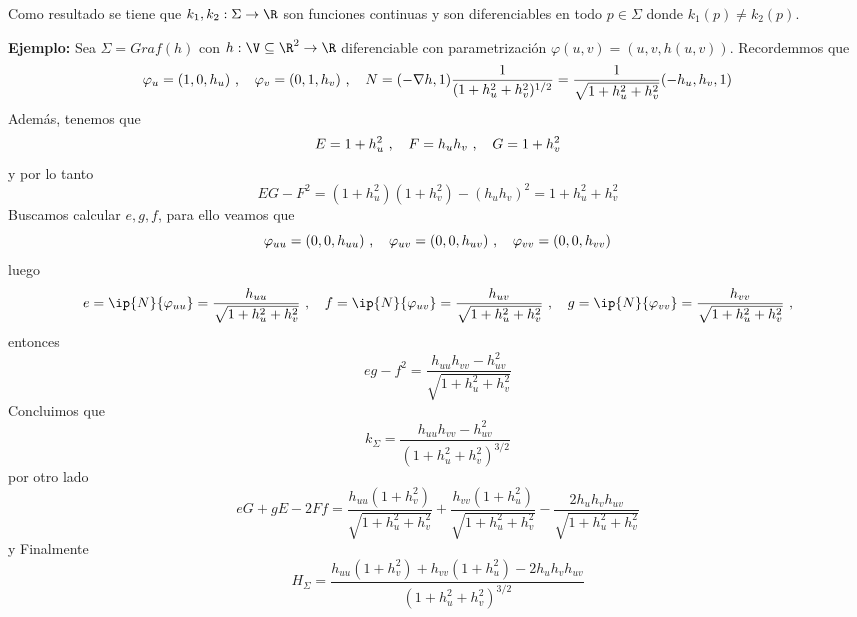 \documentclass{article}
\begin{document}
\begin{cor}
    Como resultado se tiene que $k_{1},k_{2}:\Sigma\to\R$ son funciones continuas y son 
    diferenciables en todo $p\in\Sigma$ donde $k_{1}(p)\neq k_{2}(p)$.
\end{cor}
\noindent\textbf{Ejemplo:} Sea $\Sigma=Graf(h)$ con $h:\V\subseteq\R^{2}\to\R$ diferenciable con 
parametrización $\varphi(u,v)=(u,v,h(u,v))$. Recordemmos que
\begin{equation*}
    \varphi_{u}=(1,0,h_{u})\text{ ,}\hspace{4mm}\varphi_{v}=(0,1,h_{v})\text{ ,}\hspace{4mm}
    N=(-\nabla h,1)\frac{1}{(1+h_{u}^{2}+h_{v}^{2})^{1/2}}=\frac{1}{\sqrt{1+h_{u}^{2}+h_{v}^{2}}}
    (-h_{u},h_{v},1)
\end{equation*}
Además, tenemos que
\begin{equation*}
    E=1+h_{u}^{2}\text{ ,}\hspace{4mm}F=h_{u}h_{v}\text{ ,}\hspace{4mm}G=1+h_{v}^{2}
\end{equation*}
y por lo tanto
\begin{equation*}
    EG-F^{2}=(1+h_{u}^{2})(1+h_{v}^{2})-(h_{u}h_{v})^{2}=1+h_{u}^{2}+h_{v}^{2}
\end{equation*}
Buscamos calcular $e,g,f$, para ello veamos que
\begin{equation*}
    \varphi_{uu}=(0,0,h_{uu})\text{ ,}\hspace{4mm}\varphi_{uv}=(0,0,h_{uv})\text{ ,}\hspace{4mm}
    \varphi_{vv}=(0,0,h_{vv})
\end{equation*}
luego
\begin{equation*}
    e=\ip{N}{\varphi_{uu}}=\frac{h_{uu}}{\sqrt{1+h_{u}^{2}+h_{v}^{2}}}\text{ ,}\hspace{4mm}
    f=\ip{N}{\varphi_{uv}}=\frac{h_{uv}}{\sqrt{1+h_{u}^{2}+h_{v}^{2}}}\text{ ,}\hspace{4mm}
    g=\ip{N}{\varphi_{vv}}=\frac{h_{vv}}{\sqrt{1+h_{u}^{2}+h_{v}^{2}}}\text{ ,}
\end{equation*}
entonces
\begin{equation*}
    eg-f^{2}=\frac{h_{uu}h_{vv}-h_{uv}^{2}}{\sqrt{1+h_{u}^{2}+h_{v}^{2}}}
\end{equation*}
Concluimos que
\begin{equation*}
    k_{\Sigma}=\frac{h_{uu}h_{vv}-h_{uv}^{2}}{(1+h_{u}^{2}+h_{v}^{2})^{3/2}}
\end{equation*}
por otro lado
\begin{equation*}
    eG+gE-2Ff=\frac{h_{uu}(1+h_{v}^{2})}{\sqrt{1+h_{u}^{2}+h_{v}^{2}}}+
    \frac{h_{vv}(1+h_{u}^{2})}{\sqrt{1+h_{u}^{2}+h_{v}^{2}}}-
    \frac{2h_{u}h_{v}h_{uv}}{\sqrt{1+h_{u}^{2}+h_{v}^{2}}}
\end{equation*}
y Finalmente
\begin{equation*}
    H_{\Sigma}=\frac{h_{uu}(1+h_{v}^{2})+h_{vv}(1+h_{u}^{2})-2h_{u}h_{v}h_{uv}}
    {(1+h_{u}^{2}+h_{v}^{2})^{3/2}}
\end{equation*}
\end{document}
